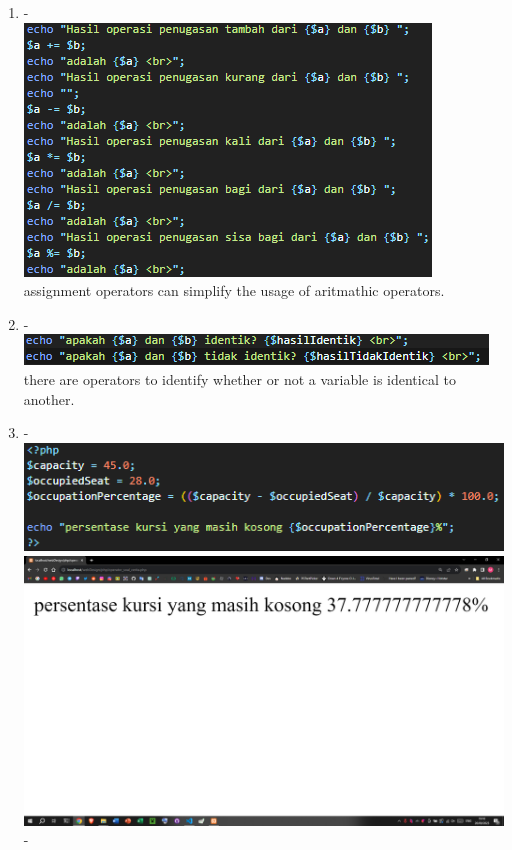 \documentclass[12pt,titlepage]{article}
\begin{document}
\begin{enumerate}[label*=\arabic*.]
\begin{enumerate}[label*=\arabic*.]
        \newpage
        \item - \\ \includegraphics[width=.8\textwidth]{images/figures/fig4.png} \\ assignment operators can simplify the usage of aritmathic operators. 
        \item - \\ \includegraphics[width=.8\textwidth]{images/figures/fig5.png} \\ there are operators to identify whether or not a variable is identical to another. 
        \item - \\ \includegraphics[width=.8\textwidth]{images/figures/fig6.png} \\ \includegraphics[width=.8\textwidth]{images/figures/fig7.png} \\ -
    \end{enumerate}
    \newpage

\end{enumerate}
\end{document}
